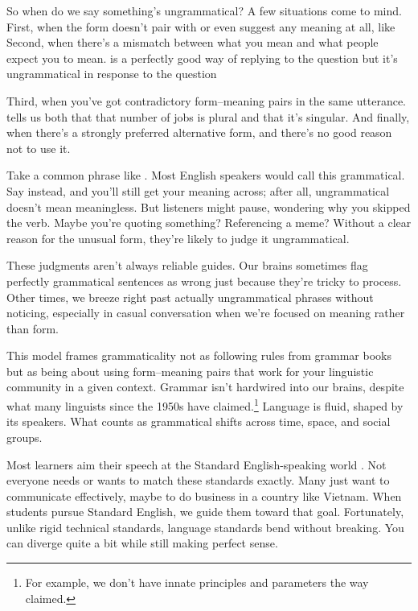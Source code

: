So when do we say something's ungrammatical? A few situations come to mind. First, when the form doesn't pair with or even suggest any meaning at all, like  Second, when there's a mismatch between what you mean and what people expect you to mean.  is a perfectly good way of replying to the question  but it's ungrammatical in response to the question 


Third, when you've got contradictory form--meaning pairs in the same utterance.  tells us both that that number of jobs is plural and that it's singular. And finally, when there's a strongly preferred alternative form, and there's no good reason not to use it.

Take a common phrase like . Most English speakers would call this grammatical. Say  instead, and you'll still get your meaning across; after all, ungrammatical doesn't mean meaningless. But listeners might pause, wondering why you skipped the verb. Maybe you're quoting something? Referencing a meme? Without a clear reason for the unusual form, they're likely to judge it ungrammatical.

These judgments aren't always reliable guides. Our brains sometimes flag perfectly grammatical sentences as wrong just because they're tricky to process. Other times, we breeze right past actually ungrammatical phrases without noticing, especially in casual conversation when we're focused on meaning rather than form.

This model frames grammaticality not as following rules from grammar books but as being about using form--meaning pairs that work for your linguistic community in a given context. Grammar isn't hardwired into our brains, despite what many linguists since the 1950s have claimed.\footnote{For example, we don't have innate principles and parameters the way \citet{chomsky1981lectures} claimed.} Language is fluid, shaped by its speakers. What counts as grammatical shifts across time, space, and social groups.

Most learners aim their speech at the Standard English-speaking world \citep[e.g.,][]{Rezaei2019}. Not everyone needs or wants to match these standards exactly. Many just want to communicate effectively, maybe to do business in a country like Vietnam. When students pursue Standard English, we guide them toward that goal. Fortunately, unlike rigid technical standards, language standards bend without breaking. You can diverge quite a bit while still making perfect sense.

